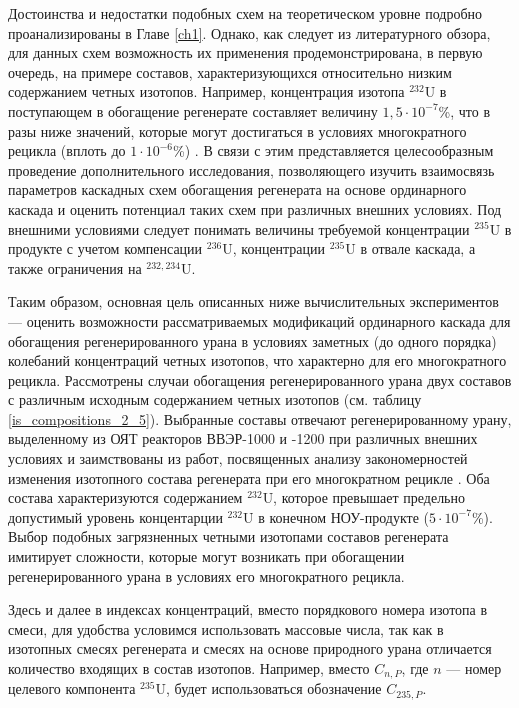 Достоинства и недостатки подобных схем на теоретическом уровне подробно проанализированы в Главе \ref{ch1}. Однако, как следует из литературного обзора, для данных схем возможность их применения продемонстрирована, в первую очередь, на примере составов, характеризующихся относительно низким содержанием четных изотопов. Например, концентрация изотопа $^{232}$U в поступающем в обогащение регенерате составляет величину $1,5\cdot10^{-7}$\%, что в разы ниже значений, которые могут достигаться в условиях многократного рецикла (вплоть до $1\cdot10^{-6}$\%) \cite{palkinDesignanalyticalResearchRefinement2010}.
В связи с этим представляется целесообразным проведение дополнительного исследования, позволяющего изучить взаимосвязь параметров каскадных схем обогащения регенерата на основе ординарного каскада и оценить потенциал таких схем при различных внешних условиях. Под внешними условиями следует понимать величины требуемой концентрации $^{235}$U в продукте с учетом компенсации $^{236}$U, концентрации $^{235}$U в отвале каскада, а также ограничения на $^{232,234}$U.

Таким образом, основная цель описанных ниже вычислительных экспериментов --- оценить возможности рассматриваемых модификаций ординарного каскада для обогащения регенерированного урана в условиях заметных (до одного порядка) колебаний концентраций четных изотопов, что характерно для его многократного рецикла. Рассмотрены случаи обогащения регенерированного урана двух составов с различным исходным содержанием четных изотопов (см. таблицу \ref{is_compositions_2_5}). Выбранные составы отвечают регенерированному урану, выделенному из ОЯТ реакторов ВВЭР-1000 и -1200 при различных внешних условиях  и заимствованы из работ, посвященных анализу закономерностей изменения изотопного состава регенерата при его многократном рецикле \cite{palkinDesignanalyticalResearchRefinement2010,nevinicaToplivnyyCiklLegkovodnogo2019}. Оба состава характеризуются содержанием $^{232}$U, которое превышает предельно допустимый уровень концентарции $^{232}$U в конечном НОУ-продукте ($5\cdot10^{-7}$\%). Выбор подобных загрязненных четными изотопами составов регенерата имитирует сложности, которые могут возникать при обогащении регенерированного урана в условиях его многократного рецикла.

Здесь и далее в индексах концентраций, вместо порядкового номера изотопа в смеси, для удобства условимся использовать массовые числа, так как в изотопных смесях регенерата и смесях на основе природного урана отличается количество входящих в состав изотопов. Например, вместо $C_{n,P}$, где $n$ --- номер целевого компонента $^{235}$U, будет использоваться обозначение $C_{235,P}$.

